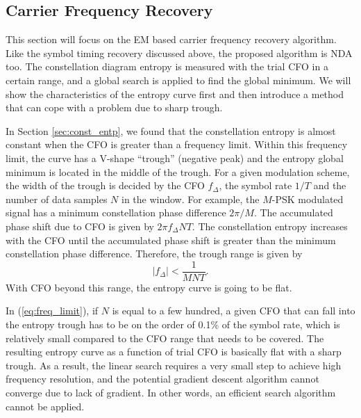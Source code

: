 \documentclass[journal,comsoc,onecolumn, 12pt,draftclsnofoot]{IEEEtran}
\begin{document}
\subsection{Carrier Frequency Recovery}
This section will focus on the EM based carrier frequency recovery algorithm.
Like the symbol timing recovery discussed above, the proposed algorithm is NDA too.
The constellation diagram entropy is measured with the trial CFO in a certain range, and a global search is applied to find the global minimum. 
We will show the characteristics of the entropy curve first and then introduce a method that can cope with a problem due to sharp trough.

In Section \ref{sec:const_entp}, we found that the constellation entropy is almost constant when the CFO is greater than a frequency limit.
Within this frequency limit, the curve has a V-shape ``trough'' (negative peak) and the entropy global minimum is located in the middle of the trough.
For a given modulation scheme, the width of the trough is decided by the CFO $f_\Delta$, the symbol rate $1/T$ and the number of data samples $N$ in the window.
For example, the \(M\)-PSK modulated signal has a minimum constellation phase difference \(2\pi/M\).
The accumulated phase shift due to CFO is given by \(2\pi f_\Delta N T\).
The constellation entropy increases with the CFO until the accumulated phase shift is greater than the minimum constellation phase difference. 
Therefore, the trough range is given by
\begin{equation}
\left| {f_\Delta } \right| < \frac{1}{{MNT}}.
\label{eq:freq_limit}
\end{equation}
With CFO beyond this range, the entropy curve is going to be flat.


In (\ref{eq:freq_limit}), if \(N\) is equal to a few hundred, a given CFO that can fall into the entropy trough has to be on the order of 0.1\% of the symbol rate, which is relatively small compared to the CFO range that needs to be covered.
The resulting entropy curve as a function of trial CFO is basically flat with a sharp trough.
As a result, the linear search requires a very small step to achieve high frequency resolution, and the potential gradient descent algorithm cannot converge due to lack of gradient.
In other words, an efficient search algorithm cannot be applied. 
\end{document}
